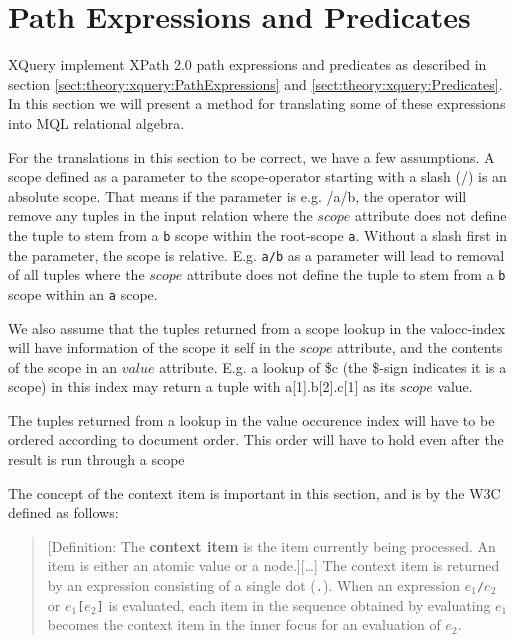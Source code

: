 \section{Path Expressions and Predicates}
\label{sect:trans:TD:pathNpred}

XQuery implement XPath 2.0 path expressions and predicates as described in section
\ref{sect:theory:xquery:PathExpressions} and \ref{sect:theory:xquery:Predicates}. In this section we will present
a method for translating some of these expressions into MQL relational algebra.

For the translations in this section to be correct, we have a few assumptions. A scope defined as a parameter to
the \textsf{scope}-operator starting with a slash (\textsf{/}) is an absolute scope. That means if the parameter
is e.g. \textsf{/a/b}, the operator will remove any tuples in the input relation where the $scope$ attribute does
not define the tuple to stem from a \texttt{b} scope within the root-scope \texttt{a}. Without a slash first in
the parameter, the scope is relative. E.g. \texttt{a/b} as a parameter will lead to removal of all tuples where
the $scope$ attribute does not define the tuple to stem from a \texttt{b} scope within an \texttt{a} scope.

We also assume that the tuples returned from a scope lookup in the \textsf{valocc}-index will have information of
the scope it self in the $scope$ attribute, and the contents of the scope in an $value$ attribute. E.g. a lookup of
\textsf{\$c} (the \textsf{\$}-sign indicates it is a scope) in this index may return a tuple with
\textsf{a[1].b[2].c[1]} as its $scope$ value.

The tuples returned from a lookup in the value occurence index will have to be ordered according to document
order. This order will have to hold even after the result is run through a \textsf{scope}

The concept of the context item is important in this section, and is by the W3C defined as follows\cite{w3c00}:
\begin{quote}
[Definition: The \textbf{context item} is the item currently being processed. An item is either an atomic value or
a node.][\ldots] The context item is returned by an expression consisting of a single dot (\texttt{.}). When an
expression $e_1$\texttt{/}$e_2$ or $e_1$\texttt{[}$e_2$\texttt{]} is evaluated, each item in the sequence obtained
by evaluating $e_1$ becomes the context item in the inner focus for an evaluation of $e_2$.
\end{quote}

